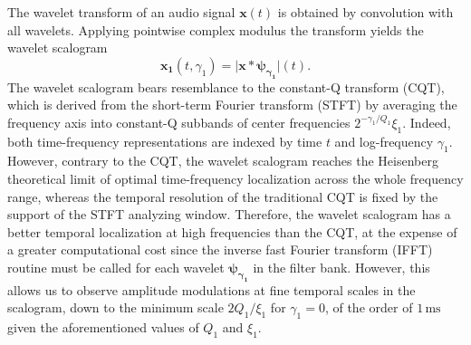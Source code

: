 \documentclass[journal]{IEEEtran}
\begin{document}
The wavelet transform of an audio signal
$\boldsymbol{x}(t)$ is obtained by convolution with all wavelets.
Applying pointwise complex modulus the transform yields
the wavelet scalogram
\begin{equation}
\boldsymbol{x_1}(t, \gamma_1)
= \vert \boldsymbol{x} \ast \boldsymbol{\psi_{\gamma_1}} \vert (t)\mbox{.}
\end{equation}
The wavelet scalogram bears resemblance to the constant-Q transform (CQT),
which is derived from the short-term Fourier transform (STFT) by averaging the frequency
axis into constant-Q subbands of center frequencies $2^{-\gamma_1/Q_1}\xi_1$.
Indeed, both time-frequency representations are indexed by time $t$ and log-frequency $\gamma_1$.
However, contrary to the CQT, the wavelet scalogram reaches the Heisenberg
theoretical limit of optimal time-frequency localization across the whole
frequency range, whereas the temporal resolution of the traditional CQT is fixed by the support of the STFT analyzing window. %
Therefore, the wavelet scalogram has a better temporal localization at high
frequencies than the CQT, at the expense of a greater computational cost
since the inverse fast Fourier transform (IFFT) routine must be called for each wavelet $\boldsymbol{\psi_{\gamma_1}}$ in the filter bank.
However, this allows us to observe amplitude modulations at fine temporal scales in the scalogram, down to the minimum scale $2Q_1/\xi_1$ for $\gamma_1 = 0$, of the order of $1\,\textrm{ms}$ given the aforementioned values of $Q_1$ and $\xi_1$.
\end{document}
